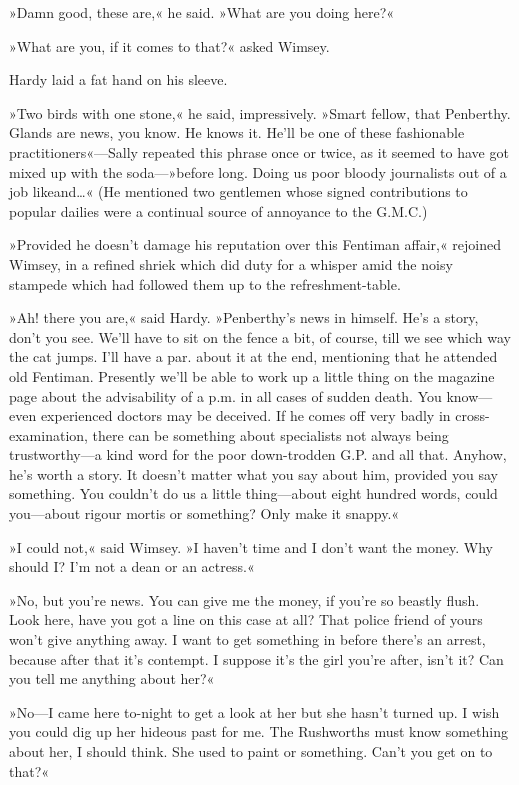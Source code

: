 »Damn good, these are,« he said. »What are you doing here?«

»What are you, if it comes to that?« asked Wimsey.

Hardy laid a fat hand on his sleeve.

»Two birds with one stone,« he said, impressively. »Smart fellow, that Penberthy. Glands are news, you know. He knows it. He'll be one of these fashionable practitioners«—Sally repeated this phrase once or twice, as it seemed to have got mixed up with the soda—»before long. Doing us poor bloody journalists out of a job like\textellipsis  and\dots« (He mentioned two gentlemen whose signed contributions to popular dailies were a continual source of annoyance to the G\@.M\@.C\@.)

»Provided he doesn't damage his reputation over this Fentiman affair,« rejoined Wimsey, in a refined shriek which did duty for a whisper amid the noisy stampede which had followed them up to the refreshment-table.

»Ah! there you are,« said Hardy. »Penberthy's news in himself. He's a story, don't you see. We'll have to sit on the fence a bit, of course, till we see which way the cat jumps. I'll have a par. about it at the end, mentioning that he attended old Fentiman. Presently we'll be able to work up a little thing on the magazine page about the advisability of a p.m. in all cases of sudden death. You know—even experienced doctors may be deceived. If he comes off very badly in cross-examination, there can be something about specialists not always being trustworthy—a kind word for the poor down-trodden G\@.P\@. and all that. Anyhow, he's worth a story. It doesn't matter what you say about him, provided you say something. You couldn't do us a little thing—about eight hundred words, could you—about rigour mortis or something? Only make it snappy.«

»I could not,« said Wimsey. »I haven't time and I don't want the money. Why should I\@? I'm not a dean or an actress.«

»No, but you're news. You can give me the money, if you're so beastly flush. Look here, have you got a line on this case at all? That police friend of yours won't give anything away. I want to get something in before there's an arrest, because after that it's contempt. I suppose it's the girl you're after, isn't it? Can you tell me anything about her?«

»No—I came here to-night to get a look at her but she hasn't turned up. I wish you could dig up her hideous past for me. The Rushworths must know something about her, I should think. She used to paint or something. Can't you get on to that?«

